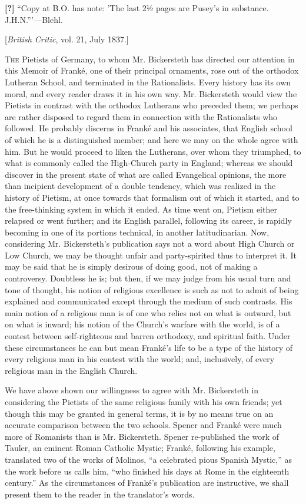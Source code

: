 \textbf{[?]} ``Copy at B.O. has note: 'The last 2½ pages
are Pusey's in substance. J.H.N.'''—Blehl.

[\emph{British Critic}, vol. 21, July 1837.]

T\textsc{he} Pietists of Germany,
to whom Mr. Bickersteth has directed our attention in this Memoir of
Franké, one of their principal ornaments, rose out of the orthodox
Lutheran School, and terminated in the Rationalists. Every history has
its own moral, and every reader draws it in his own way. Mr. Bickersteth
would view the Pietists in contrast with the orthodox Lutherans who
preceded them; we perhaps are rather disposed to regard them in
connection with the Rationalists who followed. He probably discerns in
Franké and his associates, that English school of which he is a
distinguished member; and here we may on the whole agree with him. But
he would proceed to liken the Lutherans, over whom they triumphed, to
what is commonly called the High-Church party in England; whereas we
should discover in the present state of what are called Evangelical
opinions, the more than incipient development of a double tendency,
which was realized in the history of Pietism, at once towards that
formalism out of which it started, and to the free-thinking system in
which it ended. As time went on, Pietism either relapsed or went
further; and its English parallel, following its career, is rapidly
becoming in one of its portions technical, in another
latitudinarian. Now, considering Mr. Bickersteth's publication says not
a word about High Church or Low Church, we may be thought unfair and
party-spirited thus to interpret it. It may be said that he is simply
desirous of doing good, not of making a controversy. Doubtless he is;
but then, if we may judge from his usual turn and tone of thought, his
notion of religious excellence is such as not to admit of being
explained and communicated except through the medium of such contrasts.
His main notion of a religious man is of one who relies not on what is
outward, but on what is inward; his notion of the Church's warfare with
the world, is of a contest between self-righteous and barren orthodoxy,
and spiritual faith. Under these circumstances he can but mean Franké's
life to be a type of the history of every religious man in his contest
with the world; and, inclusively, of every religious man in the English
Church.

We have above shown our willingness to agree with
Mr. Bickersteth in considering the Pietists of the same religious family
with his own friends; yet though this may be granted in general terms,
it is by no means true on an accurate comparison between the two
schools. Spener and Franké were much more of Romanists than is Mr.
Bickersteth. Spener re-published the work of Tauler, an eminent Roman
Catholic Mystic; Franké, following his example, translated two of the
works of Molinos, ``a celebrated pious Spanish Mystic,'' as the work
before us calls him, ``who finished his days at Rome in the eighteenth
century.'' As the circumstances of Franké's publication are instructive,
we shall present them to the reader in the translator's words.

